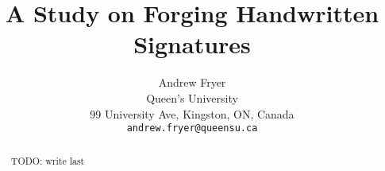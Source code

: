 \documentclass[final]{cvpr}
\begin{document}
\title{A Study on Forging Handwritten Signatures}

\author{Andrew Fryer\\
Queen's University\\
99 University Ave, Kingston, ON, Canada\\
{\tt\small andrew.fryer@queensu.ca}
}

\maketitle


\begin{abstract}

% 
   TODO: write last
\end{abstract}













{\small


}
\end{document}
